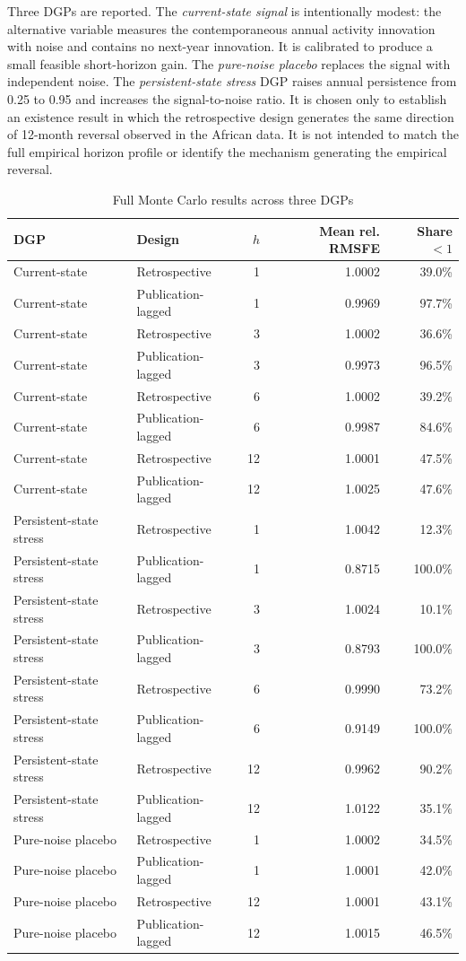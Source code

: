 \documentclass[12pt]{article}
\begin{document}
Three DGPs are reported. The \emph{current-state signal} is intentionally modest: the alternative variable measures the contemporaneous annual activity innovation with noise and contains no next-year innovation. It is calibrated to produce a small feasible short-horizon gain. The \emph{pure-noise placebo} replaces the signal with independent noise. The \emph{persistent-state stress} DGP raises annual persistence from 0.25 to 0.95 and increases the signal-to-noise ratio. It is chosen only to establish an existence result in which the retrospective design generates the same direction of 12-month reversal observed in the African data. It is not intended to match the full empirical horizon profile or identify the mechanism generating the empirical reversal.

\begin{table}[htbp]
\centering\scriptsize
\caption{Full Monte Carlo results across three DGPs}
\begin{tabular}{llrrr}
\toprule
DGP & Design & $h$ & Mean rel. RMSFE & Share $<1$\\
\midrule
Current-state & Retrospective & 1 & 1.0002 & 39.0\%\\
Current-state & Publication-lagged & 1 & 0.9969 & 97.7\%\\
Current-state & Retrospective & 3 & 1.0002 & 36.6\%\\
Current-state & Publication-lagged & 3 & 0.9973 & 96.5\%\\
Current-state & Retrospective & 6 & 1.0002 & 39.2\%\\
Current-state & Publication-lagged & 6 & 0.9987 & 84.6\%\\
Current-state & Retrospective & 12 & 1.0001 & 47.5\%\\
Current-state & Publication-lagged & 12 & 1.0025 & 47.6\%\\
\midrule
Persistent-state stress & Retrospective & 1 & 1.0042 & 12.3\%\\
Persistent-state stress & Publication-lagged & 1 & 0.8715 & 100.0\%\\
Persistent-state stress & Retrospective & 3 & 1.0024 & 10.1\%\\
Persistent-state stress & Publication-lagged & 3 & 0.8793 & 100.0\%\\
Persistent-state stress & Retrospective & 6 & 0.9990 & 73.2\%\\
Persistent-state stress & Publication-lagged & 6 & 0.9149 & 100.0\%\\
Persistent-state stress & Retrospective & 12 & 0.9962 & 90.2\%\\
Persistent-state stress & Publication-lagged & 12 & 1.0122 & 35.1\%\\
\midrule
Pure-noise placebo & Retrospective & 1 & 1.0002 & 34.5\%\\
Pure-noise placebo & Publication-lagged & 1 & 1.0001 & 42.0\%\\
Pure-noise placebo & Retrospective & 12 & 1.0001 & 43.1\%\\
Pure-noise placebo & Publication-lagged & 12 & 1.0015 & 46.5\%\\
\bottomrule
\end{tabular}
\end{table}
\end{document}
